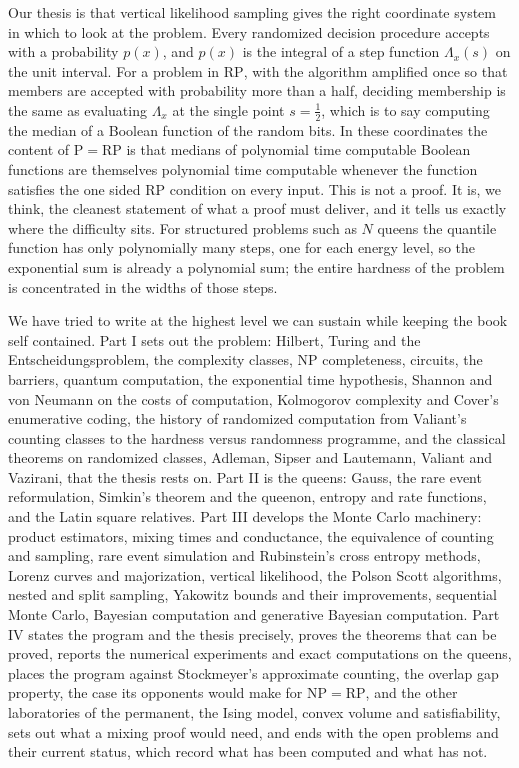 \documentclass[11pt,twoside,openany]{book}
\theoremstyle{plain}
\theoremstyle{definition}
\theoremstyle{remark}
\newcommand{\RP}{\mathrm{RP}}
\newcommand{\NP}{\mathrm{NP}}
\newcommand{\Pc}{\mathrm{P}}
\begin{document}
Our thesis is that vertical likelihood sampling gives the right coordinate system in which to look at the problem. Every randomized decision procedure accepts with a probability $p(x)$, and $p(x)$ is the integral of a step function $\Lambda_x(s)$ on the unit interval. For a problem in $\RP$, with the algorithm amplified once so that members are accepted with probability more than a half, deciding membership is the same as evaluating $\Lambda_x$ at the single point $s = \tfrac12$, which is to say computing the median of a Boolean function of the random bits. In these coordinates the content of $\Pc = \RP$ is that medians of polynomial time computable Boolean functions are themselves polynomial time computable whenever the function satisfies the one sided $\RP$ condition on every input. This is not a proof. It is, we think, the cleanest statement of what a proof must deliver, and it tells us exactly where the difficulty sits. For structured problems such as $N$ queens the quantile function has only polynomially many steps, one for each energy level, so the exponential sum is already a polynomial sum; the entire hardness of the problem is concentrated in the widths of those steps.

We have tried to write at the highest level we can sustain while keeping the book self contained. Part I sets out the problem: Hilbert, Turing and the Entscheidungsproblem, the complexity classes, NP completeness, circuits, the barriers, quantum computation, the exponential time hypothesis, Shannon and von Neumann on the costs of computation, Kolmogorov complexity and Cover's enumerative coding, the history of randomized computation from Valiant's counting classes to the hardness versus randomness programme, and the classical theorems on randomized classes, Adleman, Sipser and Lautemann, Valiant and Vazirani, that the thesis rests on. Part II is the queens: Gauss, the rare event reformulation, Simkin's theorem and the queenon, entropy and rate functions, and the Latin square relatives. Part III develops the Monte Carlo machinery: product estimators, mixing times and conductance, the equivalence of counting and sampling, rare event simulation and Rubinstein's cross entropy methods, Lorenz curves and majorization, vertical likelihood, the Polson Scott algorithms, nested and split sampling, Yakowitz bounds and their improvements, sequential Monte Carlo, Bayesian computation and generative Bayesian computation. Part IV states the program and the thesis precisely, proves the theorems that can be proved, reports the numerical experiments and exact computations on the queens, places the program against Stockmeyer's approximate counting, the overlap gap property, the case its opponents would make for $\NP = \RP$, and the other laboratories of the permanent, the Ising model, convex volume and satisfiability, sets out what a mixing proof would need, and ends with the open problems and their current status, which record what has been computed and what has not.
\end{document}
